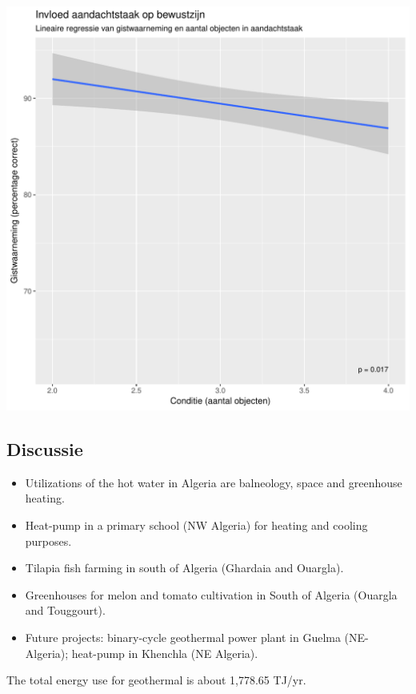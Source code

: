 \documentclass[a1,portrait]{a0poster}
\begin{document}
\begin{multicols}{3}
\begin{center}\vspace{1cm}
\includegraphics[width=1.0\linewidth]{lineaireRegressie.pdf}
\end{center}\vspace{1cm}

\subsection*{Discussie}
\begin{itemize}
\item Utilizations of the hot water in Algeria are balneology, space and greenhouse heating. 
\item Heat-pump in a primary school (NW Algeria) for heating and cooling purposes.
\item Tilapia fish farming in south of Algeria (Ghardaia and Ouargla).
\item Greenhouses for melon and tomato cultivation in South of Algeria (Ouargla and Touggourt).
\item Future projects: binary-cycle geothermal power plant in Guelma (NE-Algeria); heat-pump in Khenchla (NE Algeria).
\end{itemize}
The total energy use for geothermal is about 1,778.65 TJ/yr.


\end{multicols}
\end{document}
